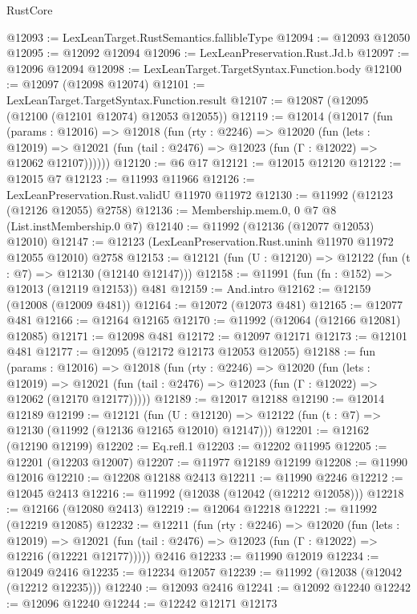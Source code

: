 \begin{lexlean}{RustCore}
\begin{coremodule}
@12093 := LexLeanTarget.RustSemantics.fallibleType
@12094 := @12093 @12050
@12095 := @12092 @12094
@12096 := LexLeanPreservation.Rust.Jd.b
@12097 := @12096 @12094
@12098 := LexLeanTarget.TargetSyntax.Function.body
@12100 := @12097 (@12098 @12074)
@12101 := LexLeanTarget.TargetSyntax.Function.result
@12107 := @12087 (@12095 (@12100 (@12101 @12074) @12053 @12055))
@12119 := @12014
    (@12017
      (fun (params : @12016) =>
      @12018
        (fun (rty : @2246) =>
        @12020
          (fun (lets : @12019) =>
          @12021 (fun (tail : @2476) => @12023 (fun (Γ : @12022) => @12062 @12107))))))
@12120 := @6 @17
@12121 := @12015 @12120
@12122 := @12015 @7
@12123 := @11993 @11966
@12126 := LexLeanPreservation.Rust.validU @11970 @11972
@12130 := @11992 (@12123 (@12126 @12055) @2758)
@12136 := Membership.mem.{0, 0} @7 @8 (List.instMembership.{0} @7)
@12140 := @11992 (@12136 (@12077 @12053) @12010)
@12147 := @12123 (LexLeanPreservation.Rust.uninh @11970 @11972 @12055 @12010) @2758
@12153 := @12121 (fun (U : @12120) => @12122 (fun (t : @7) => @12130 (@12140 @12147)))
@12158 := @11991 (fun (fn : @152) => @12013 (@12119 @12153)) @481
@12159 := And.intro
@12162 := @12159 (@12008 (@12009 @481))
@12164 := @12072 (@12073 @481)
@12165 := @12077 @481
@12166 := @12164 @12165
@12170 := @11992 (@12064 (@12166 @12081) @12085)
@12171 := @12098 @481
@12172 := @12097 @12171
@12173 := @12101 @481
@12177 := @12095 (@12172 @12173 @12053 @12055)
@12188 := fun (params : @12016) =>
  @12018
    (fun (rty : @2246) =>
    @12020
      (fun (lets : @12019) =>
      @12021 (fun (tail : @2476) => @12023 (fun (Γ : @12022) => @12062 (@12170 @12177)))))
@12189 := @12017 @12188
@12190 := @12014 @12189
@12199 := @12121
    (fun (U : @12120) => @12122 (fun (t : @7) => @12130 (@11992 (@12136 @12165 @12010) @12147)))
@12201 := @12162 (@12190 @12199)
@12202 := Eq.refl.{1}
@12203 := @12202 @11995
@12205 := @12201 (@12203 @12007)
@12207 := @11977 @12189 @12199
@12208 := @11990 @12016
@12210 := @12208 @12188 @2413
@12211 := @11990 @2246
@12212 := @12045 @2413
@12216 := @11992 (@12038 (@12042 (@12212 @12058)))
@12218 := @12166 (@12080 @2413)
@12219 := @12064 @12218
@12221 := @11992 (@12219 @12085)
@12232 := @12211
    (fun (rty : @2246) =>
    @12020
      (fun (lets : @12019) =>
      @12021 (fun (tail : @2476) => @12023 (fun (Γ : @12022) => @12216 (@12221 @12177)))))
    @2416
@12233 := @11990 @12019
@12234 := @12049 @2416
@12235 := @12234 @12057
@12239 := @11992 (@12038 (@12042 (@12212 @12235)))
@12240 := @12093 @2416
@12241 := @12092 @12240
@12242 := @12096 @12240
@12244 := @12242 @12171 @12173

\end{coremodule}
\end{lexlean}
